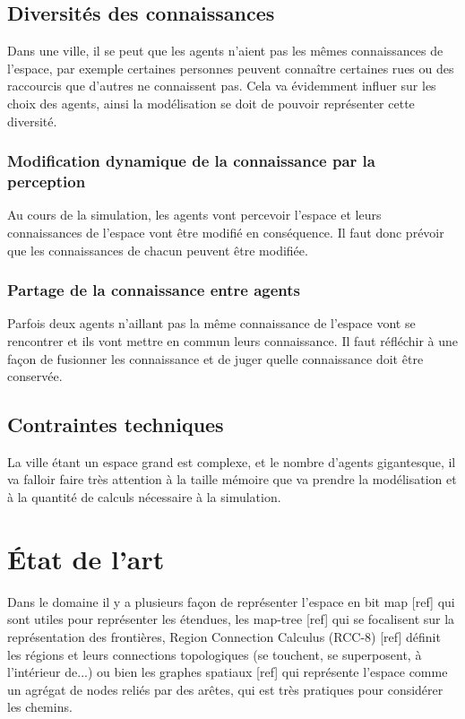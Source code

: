 \documentclass[a4paper]{article}
\begin{document}
\subsection{Diversités des connaissances}

Dans une ville, il se peut que les agents n'aient pas les mêmes connaissances
de l'espace, par exemple certaines personnes peuvent connaître certaines rues
ou des raccourcis que d'autres ne connaissent pas. Cela va évidemment influer
sur les choix des agents, ainsi la modélisation se doit de pouvoir représenter
cette diversité.

  \subsubsection{Modification dynamique de la connaissance par la perception}

  Au cours de la simulation, les agents vont percevoir l'espace et leurs
  connaissances de l'espace vont être modifié en conséquence. Il faut donc
  prévoir que les connaissances de chacun peuvent être modifiée.

  \subsubsection{Partage de la connaissance entre agents}

  Parfois deux agents n'aillant pas la même connaissance de l'espace vont se
  rencontrer et ils vont mettre en commun leurs connaissance. Il faut réfléchir
  à une façon de fusionner les connaissance et de juger quelle connaissance
  doit être conservée.

\subsection{Contraintes techniques}

La ville étant un espace grand est complexe, et le nombre d'agents gigantesque,
il va falloir faire très attention à la taille mémoire que va prendre la
modélisation et à la quantité de calculs nécessaire à la simulation.

\section{État de l'art}

Dans le domaine il y a plusieurs façon de représenter l'espace en bit map [ref]
qui sont utiles pour représenter les étendues, les map-tree [ref] qui se
focalisent sur la représentation des frontières, Region Connection Calculus
(RCC-8) [ref] définit les régions et leurs connections topologiques (se
touchent, se superposent, à l'intérieur de...) ou bien les graphes spatiaux
[ref] qui représente l'espace comme un agrégat de nodes reliés par des arêtes,
qui est très pratiques pour considérer les chemins.
\end{document}
